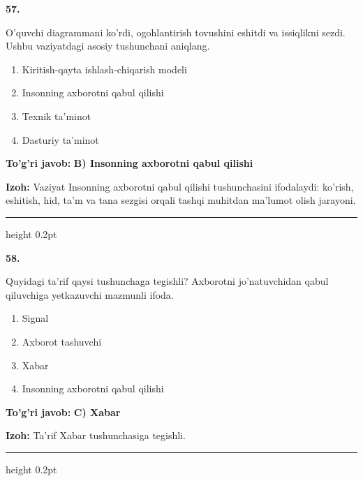 \documentclass[10pt,a4paper,oneside]{article}
\begin{document}
\noindent\textbf{\color{ink}57.}
\par
O'quvchi diagrammani ko'rdi, ogohlantirish tovushini eshitdi va issiqlikni sezdi. Ushbu vaziyatdagi asosiy tushunchani aniqlang.
\begin{enumerate}[label=\Alph*),leftmargin=9mm]
\item Kiritish-qayta ishlash-chiqarish modeli
\item Insonning axborotni qabul qilishi
\item Texnik ta'minot
\item Dasturiy ta'minot
\end{enumerate}
\begin{tcolorbox}[enhanced,breakable,colback=teal!4,colframe=teal!50!black,boxrule=0.5pt,arc=1.1mm,left=3mm,right=3mm,top=1.7mm,bottom=1.7mm,before skip=2mm,after skip=2mm]
\textbf{\color{teal}To'g'ri javob:} \textbf{B) Insonning axborotni qabul qilishi}
\par\smallskip
\textbf{Izoh:} Vaziyat Insonning axborotni qabul qilishi tushunchasini ifodalaydi: ko'rish, eshitish, hid, ta'm va tana sezgisi orqali tashqi muhitdan ma'lumot olish jarayoni.
\end{tcolorbox}
\vspace{2mm}\hrule height 0.2pt \vspace{3mm}

\noindent\textbf{\color{ink}58.}
\par
Quyidagi ta'rif qaysi tushunchaga tegishli? Axborotni jo'natuvchidan qabul qiluvchiga yetkazuvchi mazmunli ifoda.
\begin{enumerate}[label=\Alph*),leftmargin=9mm]
\item Signal
\item Axborot tashuvchi
\item Xabar
\item Insonning axborotni qabul qilishi
\end{enumerate}
\begin{tcolorbox}[enhanced,breakable,colback=teal!4,colframe=teal!50!black,boxrule=0.5pt,arc=1.1mm,left=3mm,right=3mm,top=1.7mm,bottom=1.7mm,before skip=2mm,after skip=2mm]
\textbf{\color{teal}To'g'ri javob:} \textbf{C) Xabar}
\par\smallskip
\textbf{Izoh:} Ta'rif Xabar tushunchasiga tegishli.
\end{tcolorbox}
\vspace{2mm}\hrule height 0.2pt \vspace{3mm}
\end{document}
